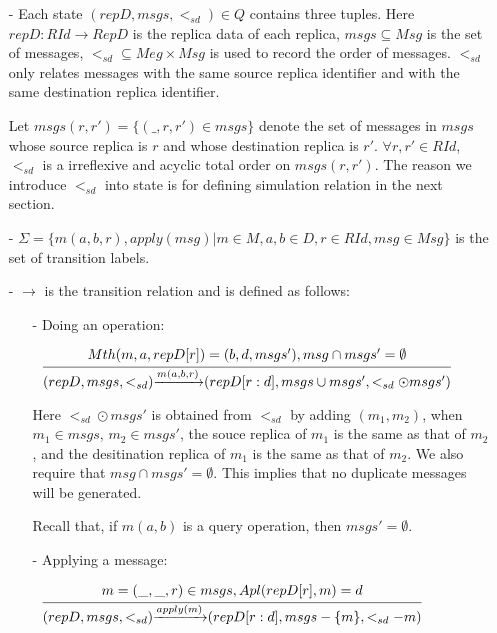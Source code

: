 {\begin{itemize}
\setlength{\itemsep}{0.5pt}
\item[-] Each state $(repD,msgs,<_{sd}) \in Q$ contains three tuples. Here $repD: RId \rightarrow RepD$ is the replica data of each replica, $msgs \subseteq Msg$ is the set of messages, $<_{sd} \subseteq Meg \times Msg$ is used to record the order of messages. $<_{sd}$ only relates messages with the same source replica identifier and with the same destination replica identifier.

Let $msgs(r,r') = \{ (\_,r,r') \in msgs \}$ denote the set of messages in $msgs$ whose source replica is $r$ and whose destination replica is $r'$. $\forall r,r' \in RId$, $<_{sd}$ is a irreflexive and acyclic total order on $msgs(r,r')$. %
The reason we introduce $<_{sd}$ into state is for defining simulation relation in the next section.

\item[-] $\Sigma = \{ m(a,b,r), apply(msg) \vert m \in M, a,b \in D, r \in RId, msg \in Msg \}$ is the set of transition labels.

\item[-] $\rightarrow$ is the transition relation and is defined as follows:

    \begin{itemize}
    \setlength{\itemsep}{0.5pt}
    \item[-] Doing an operation:

    $\begin{array}{l c} \bigfrac{ Mth(m,a,repD[r]) = (b,d,msgs'), msg \cap msgs' = \emptyset} {(repD,msgs,<_{sd}) {\xrightarrow{m(a,b,r)}} (repD[r:d],msgs \cup msgs',<_{sd} \odot msgs')} \end{array}$

    Here $<_{sd} \odot msgs'$ is obtained from $<_{sd}$ by adding  $(m_1,m_2)$, when $m_1 \in msgs$, $m_2 \in msgs'$, the souce replica of $m_1$ is the same as that of $m_2$, and the desitination replica of $m_1$ is the same as that of $m_2$. {\color {red} We also require that $msg \cap msgs' = \emptyset$. This implies that no duplicate messages will be generated.}

    Recall that, if $m(a,b)$ is a query operation, then $msgs' = \emptyset$.

    \item[-] Applying a message:

    $\begin{array}{l c} \bigfrac{ m = (\_,\_,r) \in msgs,Apl(repD[r],m) = d } {(repD,msgs,<_{sd}) {\xrightarrow{apply(m)}} (repD[r:d],msgs - \{ m \},<_{sd}-m )} \end{array}$
    \end{itemize}


\end{itemize}}
